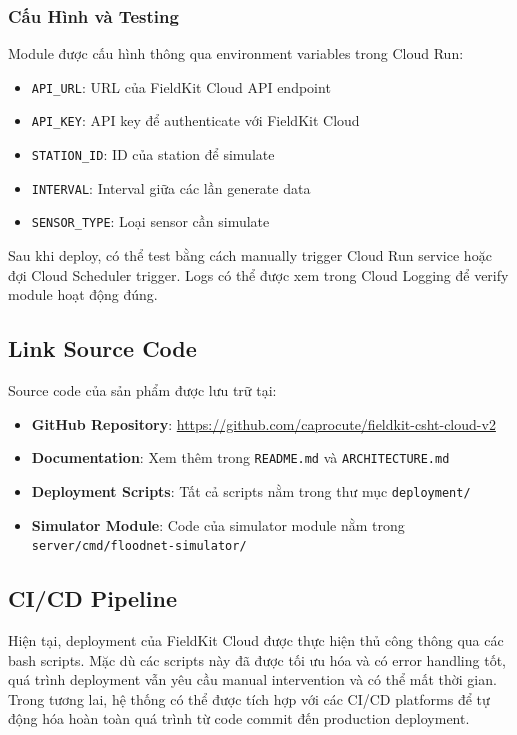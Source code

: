 \subsubsection{Cấu Hình và Testing}

Module được cấu hình thông qua environment variables trong Cloud Run:
\begin{itemize}
    \item \texttt{API\_URL}: URL của FieldKit Cloud API endpoint
    \item \texttt{API\_KEY}: API key để authenticate với FieldKit Cloud
    \item \texttt{STATION\_ID}: ID của station để simulate
    \item \texttt{INTERVAL}: Interval giữa các lần generate data
    \item \texttt{SENSOR\_TYPE}: Loại sensor cần simulate
\end{itemize}

Sau khi deploy, có thể test bằng cách manually trigger Cloud Run service hoặc đợi Cloud Scheduler trigger. Logs có thể được xem trong Cloud Logging để verify module hoạt động đúng.

\subsection{Link Source Code}

Source code của sản phẩm được lưu trữ tại:
\begin{itemize}
    \item \textbf{GitHub Repository}: \url{https://github.com/caprocute/fieldkit-csht-cloud-v2}
    \item \textbf{Documentation}: Xem thêm trong \texttt{README.md} và \texttt{ARCHITECTURE.md}
    \item \textbf{Deployment Scripts}: Tất cả scripts nằm trong thư mục \texttt{deployment/}
    \item \textbf{Simulator Module}: Code của simulator module nằm trong \texttt{server/cmd/floodnet-simulator/}
\end{itemize}

\subsection{CI/CD Pipeline}

Hiện tại, deployment của FieldKit Cloud được thực hiện thủ công thông qua các bash scripts. Mặc dù các scripts này đã được tối ưu hóa và có error handling tốt, quá trình deployment vẫn yêu cầu manual intervention và có thể mất thời gian. Trong tương lai, hệ thống có thể được tích hợp với các CI/CD platforms để tự động hóa hoàn toàn quá trình từ code commit đến production deployment.

